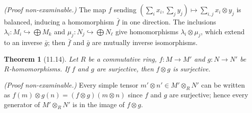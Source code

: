 \documentclass[12pt]{article}
\newtheorem{theorem}{Theorem}
\begin{document}
\noindent\textit{(Proof non-examinable.)} The map $f$ sending $(\sum_i x_i, \sum_j y_j) \mapsto \sum_{i,j} x_i \otimes y_j$ is balanced, inducing a homomorphism $\bar{f}$ in one direction. The inclusions $\lambda_i : M_i \hookrightarrow \bigoplus M_k$ and $\mu_j : N_j \hookrightarrow \bigoplus N_\ell$ give homomorphisms $\lambda_i \otimes \mu_j$, which extend to an inverse $\bar{g}$; then $\bar{f}$ and $\bar{g}$ are mutually inverse isomorphisms.

\begin{theorem}[11.14]
Let $R$ be a commutative ring, $f : M \to M'$ and $g : N \to N'$ be $R$-homomorphisms. If $f$ and $g$ are surjective, then $f \otimes g$ is surjective.
\end{theorem}

\noindent\textit{(Proof non-examinable.)} Every simple tensor $m' \otimes n' \in M' \otimes_R N'$ can be written as $f(m) \otimes g(n) = (f \otimes g)(m \otimes n)$ since $f$ and $g$ are surjective; hence every generator of $M' \otimes_R N'$ is in the image of $f \otimes g$.
\end{document}
